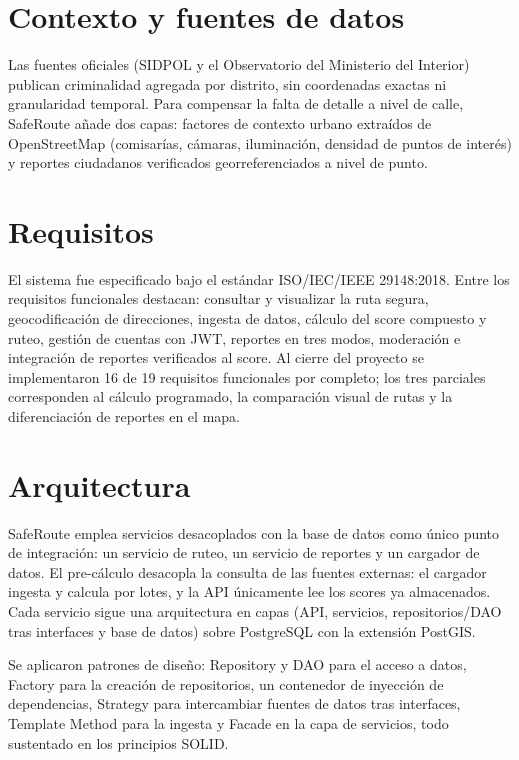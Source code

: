 \documentclass[conference]{IEEEtran}
\begin{document}
\section{Contexto y fuentes de datos}
Las fuentes oficiales (SIDPOL y el Observatorio del Ministerio del Interior) publican criminalidad agregada por distrito, sin coordenadas exactas ni granularidad temporal. Para compensar la falta de detalle a nivel de calle, SafeRoute añade dos capas: factores de contexto urbano extraídos de OpenStreetMap (comisarías, cámaras, iluminación, densidad de puntos de interés) y reportes ciudadanos verificados georreferenciados a nivel de punto.

\section{Requisitos}
El sistema fue especificado bajo el estándar ISO/IEC/IEEE 29148:2018. Entre los requisitos funcionales destacan: consultar y visualizar la ruta segura, geocodificación de direcciones, ingesta de datos, cálculo del score compuesto y ruteo, gestión de cuentas con JWT, reportes en tres modos, moderación e integración de reportes verificados al score. Al cierre del proyecto se implementaron 16 de 19 requisitos funcionales por completo; los tres parciales corresponden al cálculo programado, la comparación visual de rutas y la diferenciación de reportes en el mapa.

\section{Arquitectura}
SafeRoute emplea servicios desacoplados con la base de datos como único punto de integración: un servicio de ruteo, un servicio de reportes y un cargador de datos. El pre-cálculo desacopla la consulta de las fuentes externas: el cargador ingesta y calcula por lotes, y la API únicamente lee los scores ya almacenados. Cada servicio sigue una arquitectura en capas (API, servicios, repositorios/DAO tras interfaces y base de datos) sobre PostgreSQL con la extensión PostGIS.

Se aplicaron patrones de diseño: Repository y DAO para el acceso a datos, Factory para la creación de repositorios, un contenedor de inyección de dependencias, Strategy para intercambiar fuentes de datos tras interfaces, Template Method para la ingesta y Facade en la capa de servicios, todo sustentado en los principios SOLID.
\end{document}
